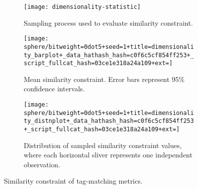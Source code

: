 \begin{figure*}
\begin{center}

\begin{minipage}{0.15\linewidth}
\begin{subfigure}[b]{\linewidth}
\texttt{[image: dimensionality-statistic]}
\caption{
Sampling process used to evaluate similarity constraint.
}
\label{fig:dimensionality_measure}
\end{subfigure}
\end{minipage}%
\begin{minipage}{0.35\textwidth}
\begin{subfigure}[b]{\linewidth}
\centering
\texttt{[image: sphere/bitweight=0dot5+seed=1+title=dimensionality\_barplot+\_data\_hathash\_hash=c0f6c5cf854ff253+\_script\_fullcat\_hash=03ce1e318a24a109+ext=]}
\begin{minipage}{0.8\textwidth}
\caption{
Mean similarity constraint.
Error bars represent 95\% confidence intervals.
}
\label{fig:sphere_barplot}
\end{minipage}
\end{subfigure}
\end{minipage}%
\begin{minipage}{0.5\linewidth}
\begin{subfigure}[b]{\linewidth}
\centering
\texttt{[image: sphere/bitweight=0dot5+seed=1+title=dimensionality\_distnplot+\_data\_hathash\_hash=c0f6c5cf854ff253+\_script\_fullcat\_hash=03ce1e318a24a109+ext=]}
\begin{minipage}{0.8\textwidth}
\caption{
Distribution of sampled similarity constraint values, where each horizontal sliver represents one independent observation.
}
\label{fig:sphere_distnplot}
\end{minipage}
\end{subfigure}
\end{minipage}

\caption{
Similarity constraint of tag-matching metrics.
}
\label{fig:sphere}

\end{center}
\end{figure*}
